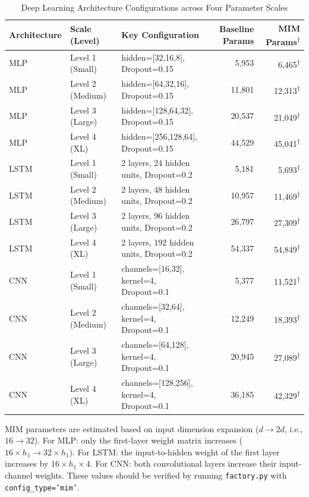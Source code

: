 \documentclass[5p,times]{elsarticle}
\begin{document}
\begin{table}[!htbp]
\centering
\small
\caption{Deep Learning Architecture Configurations across Four Parameter Scales}
\label{tab:model_config}
\begin{tabularx}{\textwidth}{@{}llXrr@{}}
\toprule
\textbf{Architecture} & \textbf{Scale (Level)} & \textbf{Key Configuration} & \textbf{Baseline Params} & \textbf{MIM Params\textsuperscript{$\dagger$}} \\
\midrule
MLP & Level 1 (Small) & hidden=[32,16,8], Dropout=0.15 & 5,953 & 6,465\textsuperscript{$\dagger$} \\
MLP & Level 2 (Medium) & hidden=[64,32,16], Dropout=0.15 & 11,801 & 12,313\textsuperscript{$\dagger$} \\
MLP & Level 3 (Large) & hidden=[128,64,32], Dropout=0.15 & 20,537 & 21,049\textsuperscript{$\dagger$} \\
MLP & Level 4 (XL) & hidden=[256,128,64], Dropout=0.15 & 44,529 & 45,041\textsuperscript{$\dagger$} \\
\midrule
LSTM & Level 1 (Small) & 2 layers, 24 hidden units, Dropout=0.2 & 5,181 & 5,693\textsuperscript{$\dagger$} \\
LSTM & Level 2 (Medium) & 2 layers, 48 hidden units, Dropout=0.2 & 10,957 & 11,469\textsuperscript{$\dagger$} \\
LSTM & Level 3 (Large) & 2 layers, 96 hidden units, Dropout=0.2 & 26,797 & 27,309\textsuperscript{$\dagger$} \\
LSTM & Level 4 (XL) & 2 layers, 192 hidden units, Dropout=0.2 & 54,337 & 54,849\textsuperscript{$\dagger$} \\
\midrule
CNN & Level 1 (Small) & channels=[16,32], kernel=4, Dropout=0.1 & 5,377 & 11,521\textsuperscript{$\dagger$} \\
CNN & Level 2 (Medium) & channels=[32,64], kernel=4, Dropout=0.1 & 12,249 & 18,393\textsuperscript{$\dagger$} \\
CNN & Level 3 (Large) & channels=[64,128], kernel=4, Dropout=0.1 & 20,945 & 27,089\textsuperscript{$\dagger$} \\
CNN & Level 4 (XL) & channels=[128,256], kernel=4, Dropout=0.1 & 36,185 & 42,329\textsuperscript{$\dagger$} \\
\bottomrule
\end{tabularx}
\begin{tablenotes}
\item [$\dagger$] MIM parameters are estimated based on input dimension expansion ($d \rightarrow 2d$, i.e., $16 \rightarrow 32$). For MLP: only the first-layer weight matrix increases ($16 \times h_1 \rightarrow 32 \times h_1$). For LSTM: the input-to-hidden weight of the first layer increases by $16 \times h_1 \times 4$. For CNN: both convolutional layers increase their input-channel weights. These values should be verified by running \texttt{factory.py} with \texttt{config\_type='mim'}.
\end{tablenotes}
\end{table}
\end{document}
